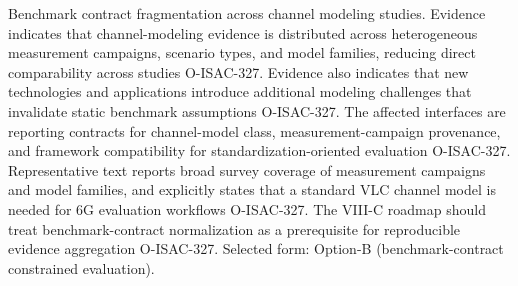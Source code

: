 {}
\markdownRendererSectionEnd \markdownRendererSectionBegin
{}\markdownRendererInterblockSeparator
{}\markdownRendererOlBegin
{} Benchmark contract fragmentation across channel modeling studies.\markdownRendererOlItemEnd 
{} Evidence indicates that channel-modeling evidence is distributed across heterogeneous measurement campaigns, scenario types, and model families, reducing direct comparability across studies O-ISAC-327. Evidence also indicates that new technologies and applications introduce additional modeling challenges that invalidate static benchmark assumptions O-ISAC-327.\markdownRendererOlItemEnd 
{} The affected interfaces are reporting contracts for channel-model class, measurement-campaign provenance, and framework compatibility for standardization-oriented evaluation O-ISAC-327.\markdownRendererOlItemEnd 
{} Representative text reports broad survey coverage of measurement campaigns and model families, and explicitly states that a standard VLC channel model is needed for 6G evaluation workflows O-ISAC-327.\markdownRendererOlItemEnd 
{} The VIII-C roadmap should treat benchmark-contract normalization as a prerequisite for reproducible evidence aggregation O-ISAC-327.\markdownRendererOlItemEnd 
\markdownRendererOlEnd \markdownRendererInterblockSeparator
{}
\markdownRendererSectionEnd \markdownRendererSectionBegin
{}\markdownRendererInterblockSeparator
{}Selected form: Option-B (benchmark-contract constrained evaluation).\markdownRendererParagraphSeparator
{}\markdownRendererSoftLineBreak
{}\markdownRendererParagraphSeparator
